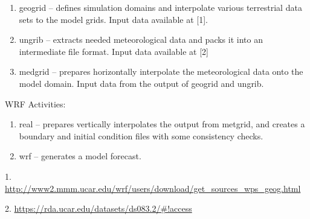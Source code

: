 \begin{enumerate}
\item geogrid – defines simulation domains and interpolate various terrestrial data sets to the
model grids. Input data available at [1].
\item ungrib – extracts needed meteorological data and packs it into an intermediate file format.
Input data available at [2]
\item medgrid – prepares horizontally interpolate the meteorological data onto the model domain.
Input data from the output of geogrid and ungrib.
\end{enumerate}

WRF Activities:

\begin{enumerate}
\item real – prepares vertically interpolates the output from metgrid, and creates a boundary and initial
condition files with some consistency checks.
\item wrf – generates a model forecast.

\end{enumerate}


1. \url{http://www2.mmm.ucar.edu/wrf/users/download/get_sources_wps_geog.html}

2. \url{https://rda.ucar.edu/datasets/ds083.2/#!access}
